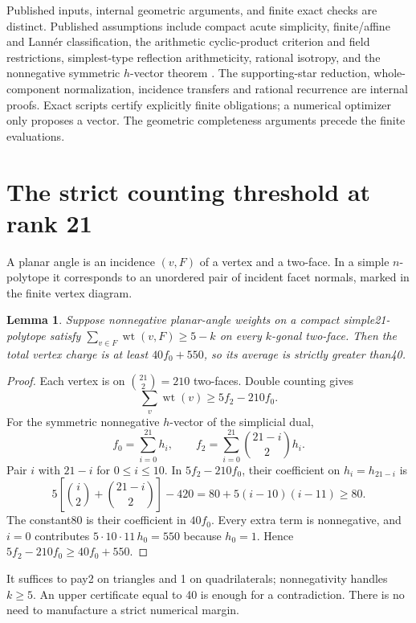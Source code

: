 \documentclass[11pt]{article}
\newtheorem{lemma}[theorem]{Lemma}
\newcommand{\wt}{\operatorname{wt}}
\begin{document}
Published inputs, internal geometric arguments, and finite exact checks
are distinct. Published assumptions include compact acute simplicity,
finite/affine and Lann\'er classification, the arithmetic cyclic-product
criterion and field restrictions, simplest-type reflection arithmeticity,
rational isotropy, and the nonnegative symmetric $h$-vector theorem
\cite{Vinberg,Nikulin,Belolipetsky}.
The supporting-star reduction, whole-component normalization, incidence
transfers and rational recurrence are internal proofs. Exact scripts
certify explicitly finite obligations; a numerical optimizer only
proposes a vector. The geometric completeness arguments precede the
finite evaluations.

\section{The strict counting threshold at rank 21}
A planar angle is an incidence $(v,F)$ of a vertex and a two-face. In
a simple $n$-polytope it corresponds to an unordered pair of incident
facet normals, marked in the finite vertex diagram.
\begin{lemma}\label{lem:threshold}
Suppose nonnegative planar-angle weights on a compact simple21-polytope
satisfy $\sum_{v\in F}\wt(v,F)\ge5-k$ on every $k$-gonal two-face.
Then the total vertex charge is at least $40f_0+550$, so its average
is strictly greater than40.
\end{lemma}
\begin{proof}
Each vertex is on $\binom{21}{2}=210$ two-faces. Double counting gives
\[
 \sum_v\wt(v)\ge5f_2-210f_0.
\]
For the symmetric nonnegative $h$-vector of the simplicial dual,
\[
 f_0=\sum_{i=0}^{21}h_i,\qquad
 f_2=\sum_{i=0}^{21}\binom{21-i}{2}h_i.
\]
Pair $i$ with $21-i$ for $0\le i\le10$. In $5f_2-210f_0$, their
coefficient on $h_i=h_{21-i}$ is
\[
 5\left[\binom i2+\binom{21-i}{2}\right]-420
 =80+5(i-10)(i-11)\ge80.
\]
The constant80 is their coefficient in $40f_0$. Every extra term is
nonnegative, and $i=0$ contributes $5\cdot10\cdot11\,h_0=550$ because
$h_0=1$. Hence $5f_2-210f_0\ge40f_0+550$.
\end{proof}
It suffices to pay2 on triangles and 1 on quadrilaterals; nonnegativity
handles $k\ge5$. An upper certificate equal to 40 is enough for a
contradiction. There is no need to manufacture a strict numerical margin.
\end{document}
